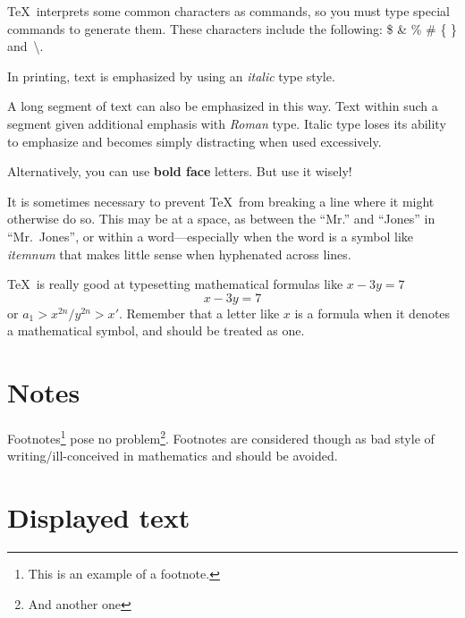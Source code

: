 \documentclass[aodsor,preprint]{imsart}
\numberwithin{equation}{section}
\theoremstyle{plain}
\begin{document}
\TeX\ interprets some common characters as commands, so you must type
special commands to generate them.  These characters include the
following:
       \$ \& \% \# \{ \} and~\textbackslash.

In printing, text is emphasized by using an
       {\em italic\/}  %
type style.

\begin{em}
   A long segment of text can also be emphasized in this way.  Text within
   such a segment given additional emphasis
      with\/ {\em Roman}
   type.  Italic type loses its ability to emphasize and becomes simply
   distracting when used excessively.
\end{em}
Alternatively, you can use \textbf{bold face} letters. But use it wisely!

It is sometimes necessary to prevent \TeX\ from breaking a line where
it might otherwise do so.  This may be at a space, as between the
``Mr.'' and ``Jones'' in
       ``Mr.~Jones'',        %
or within a word---especially when the word is a symbol like
       \mbox{\em itemnum\/}
that makes little sense when hyphenated across
       lines.

\TeX\ is really good at typesetting mathematical formulas like
       $x-3y = 7$
       $$x-3y = 7 $$
or
       $a_{1} > x^{2n} / y^{2n} > x'$.
Remember that a letter like
       $x$        %
is a formula when it denotes a mathematical symbol, and should
be treated as one.


\section{Notes}

Footnotes\footnote{This is an example of a footnote.}
pose no problem\footnote{And another one}. Footnotes are considered though as bad style of writing/ill-conceived in mathematics and should be avoided.

\section{Displayed text}
\end{document}
